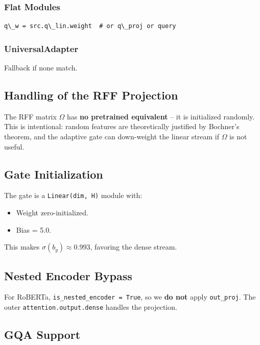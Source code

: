 \subsubsection{Flat Modules}

\begin{lstlisting}
q\_w = src.q\_lin.weight  # or q\_proj or query
\end{lstlisting}

\subsubsection{UniversalAdapter}

Fallback if none match.

\subsection{Handling of the RFF Projection}

The RFF matrix $\Omega$ has \textbf{no pretrained equivalent} -- it is initialized 
randomly. This is intentional: random features are theoretically justified 
by Bochner's theorem, and the adaptive gate can down-weight the linear 
stream if $\Omega$ is not useful.

\subsection{Gate Initialization}

The gate is a \texttt{Linear(dim, H)} module with:

\begin{itemize}
\item Weight zero-initialized.
\item Bias = 5.0.

\end{itemize}
This makes $\sigma(b_g) \approx 0.993$, favoring the dense stream.

\subsection{Nested Encoder Bypass}

For RoBERTa, \texttt{is\_nested\_encoder = True}, so we \textbf{do not} apply \texttt{out\_proj}. 
The outer \texttt{attention.output.dense} handles the projection.

\subsection{GQA Support}

